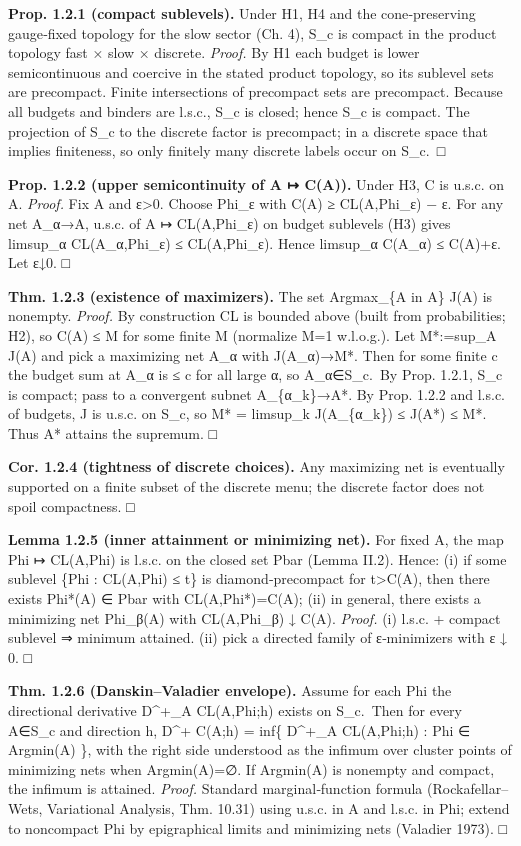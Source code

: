 \documentclass[
]{article}
\numberwithin{equation}{section}
\begin{document}
\textbf{Prop. 1.2.1 (compact sublevels).} Under H1, H4 and the
cone‑preserving gauge‑fixed topology for the slow sector (Ch. 4), S\_c
is compact in the product topology fast × slow × discrete. \emph{Proof.}
By H1 each budget is lower semicontinuous and coercive in the stated
product topology, so its sublevel sets are precompact. Finite
intersections of precompact sets are precompact. Because all budgets and
binders are l.s.c., S\_c is closed; hence S\_c is compact. The
projection of S\_c to the discrete factor is precompact; in a discrete
space that implies finiteness, so only finitely many discrete labels
occur on S\_c.~□

\textbf{Prop. 1.2.2 (upper semicontinuity of A ↦ C(A)).} Under H3, C is
u.s.c. on A. \emph{Proof.} Fix A and ε\textgreater0. Choose Phi\_ε with
C(A) ≥ CL(A,Phi\_ε) − ε. For any net A\_α→A, u.s.c. of A ↦ CL(A,Phi\_ε)
on budget sublevels (H3) gives limsup\_α CL(A\_α,Phi\_ε) ≤ CL(A,Phi\_ε).
Hence limsup\_α C(A\_α) ≤ C(A)+ε. Let ε↓0. □

\textbf{Thm. 1.2.3 (existence of maximizers).} The set Argmax\_\{A in
A\} J(A) is nonempty. \emph{Proof.} By construction CL is bounded above
(built from probabilities; H2), so C(A) ≤ M for some finite M (normalize
M=1 w.l.o.g.). Let M*:=sup\_A J(A) and pick a maximizing net A\_α with
J(A\_α)→M*. Then for some finite c the budget sum at A\_α is ≤ c for all
large α, so A\_α∈S\_c.~By Prop. 1.2.1, S\_c is compact; pass to a
convergent subnet A\_\{α\_k\}→A*. By Prop. 1.2.2 and l.s.c. of budgets,
J is u.s.c. on S\_c, so M* = limsup\_k J(A\_\{α\_k\}) ≤ J(A*) ≤ M*. Thus
A* attains the supremum. □

\textbf{Cor. 1.2.4 (tightness of discrete choices).} Any maximizing net
is eventually supported on a finite subset of the discrete menu; the
discrete factor does not spoil compactness. □

\textbf{Lemma 1.2.5 (inner attainment or minimizing net).} For fixed A,
the map Phi ↦ CL(A,Phi) is l.s.c. on the closed set Pbar (Lemma II.2).
Hence: (i) if some sublevel \{Phi : CL(A,Phi) ≤ t\} is
diamond‑precompact for t\textgreater C(A), then there exists Phi*(A) ∈
Pbar with CL(A,Phi*)=C(A); (ii) in general, there exists a minimizing
net Phi\_β(A) with CL(A,Phi\_β) ↓ C(A). \emph{Proof.} (i) l.s.c. +
compact sublevel ⇒ minimum attained. (ii) pick a directed family of
ε‑minimizers with ε ↓ 0. □

\textbf{Thm. 1.2.6 (Danskin--Valadier envelope).} Assume for each Phi
the directional derivative D\^{}+\_A CL(A,Phi;h) exists on S\_c.~Then
for every A∈S\_c and direction h, D\^{}+ C(A;h) = inf\{ D\^{}+\_A
CL(A,Phi;h) : Phi ∈ Argmin(A) \}, with the right side understood as the
infimum over cluster points of minimizing nets when Argmin(A)=∅. If
Argmin(A) is nonempty and compact, the infimum is attained.
\emph{Proof.} Standard marginal‑function formula (Rockafellar--Wets,
Variational Analysis, Thm. 10.31) using u.s.c. in A and l.s.c. in Phi;
extend to noncompact Phi by epigraphical limits and minimizing nets
(Valadier 1973). □
\end{document}
